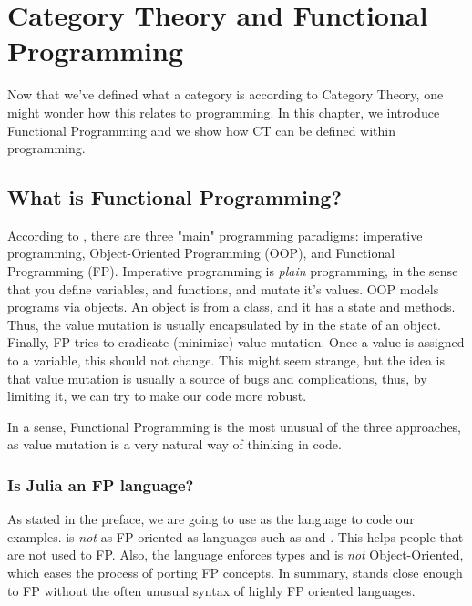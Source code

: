 \chapter{Category Theory and Functional Programming}

Now that we've defined what a category is according to Category Theory,
one might wonder how this relates to programming. In this chapter,
we introduce Functional Programming and we show how CT can be defined
within programming.

\section{What is Functional Programming?}

According to \citet{widman2022learning},
there are three "main" programming paradigms: imperative programming, Object-Oriented Programming (OOP), and Functional Programming (FP).
Imperative programming is \textit{plain} programming, in the sense that you define variables, and functions, and mutate it's values.
OOP models programs via objects. An object is from a class, and it has a state and methods. Thus, the value mutation is usually
encapsulated by in the state of an object.
Finally, FP tries to eradicate (minimize) value mutation. Once a value is assigned to a variable, this should not change.
This might seem strange, but the idea is that value mutation is usually a source of bugs and complications, thus,
by limiting it, we can try to make our code more robust.

In a sense, Functional Programming is the most unusual of the three approaches, as value mutation
is a very natural way of thinking in code.

\subsection{Is Julia an FP language?}

As stated in the preface, we are going to use
 as the language to code our examples.
 is \textit{not} as FP oriented as languages such as  and .
This helps people that are not used to FP. Also,
the language enforces types and is \textit{not} Object-Oriented, which eases
the process of porting FP concepts. In summary,  stands close enough to FP
without the often unusual syntax of highly FP oriented languages.
